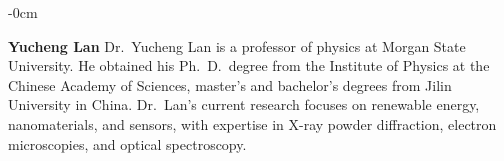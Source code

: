 \documentclass[molecules,review,submit,pdftex,moreauthors]{Definitions/mdpi}
\begin{document}
\begin{adjustwidth}{-\extralength}{0cm}
\bio

{}
{\textbf{Yucheng Lan} Dr.~Yucheng Lan is a professor of physics at Morgan State University.  He obtained his Ph.~D.~degree from the Institute of Physics at the Chinese Academy of Sciences, master's and bachelor's degrees from Jilin University in China.  Dr.~Lan's current research focuses on renewable energy, nanomaterials, and sensors, with expertise in X-ray powder diffraction, electron microscopies, and optical spectroscopy. }



\end{adjustwidth}
\end{document}
